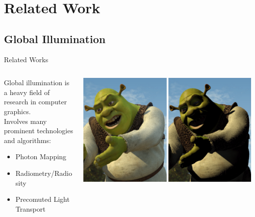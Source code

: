\documentclass[10pt,compress,professionalfont]{beamer}
\begin{document}
\section{Related Work}
\subsection{Global Illumination}
\begin{frame}{Related Works}


    \begin{columns}
        \begin{column}{0.45\textwidth}

            Global illumination is a heavy field of research in computer graphics.\\
            \vspace{8mm}
            Involves many prominent technologies and algorithms:\\
            \vspace{2mm}
            \begin{itemize}
                \item Photon Mapping\\
                \vspace{2mm}

                \item Radiometry/Radiosity\\
                \vspace{2mm}

                \item Precomuted Light Transport\\
            \end{itemize}

        \end{column}
        \begin{column}{0.55\textwidth}
            \includegraphics[width=\textwidth]{../img/external/shrek}\\
        \end{column}
    \end{columns}

\end{frame}
\end{document}
